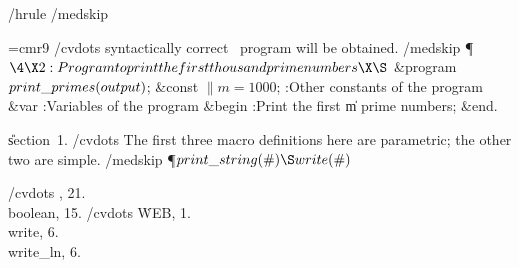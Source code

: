 \leftfloat
\ttverbatim
/hrule
/medskip

\font\ninerm=cmr9
/cvdots
syntactically correct \PASCAL\ program will
be obtained.\]
/medskip
\Y\P$\4\X2:Program to print the first
thousand prime numbers\X\S$\6
\4\&{program}\1\  $\\{print\_primes}(%
\\{output})$;\6
\4\&{const} $\|m=1000$;\5
:Other constants of the program\X\6
\4\&{var} :Variables of the program\X\6
\&{begin} :Print the first \|m prime
numbers\X;\6
\&{end}.\par
\U section~1.\fi
/cvdots
The first three macro definitions here are
parametric; the other two are simple.\]
/medskip
\Y\P\D {}$\\{print\_string}(\#)\S\\{write}(%
\#)$\par
/cvdots
\inx
{}, 21.
\:\\{boolean}, 15.
/cvdots
\:\.{WEB}, 1.
\:\\{write}, 6.
\:\\{write\_ln}, 6.
